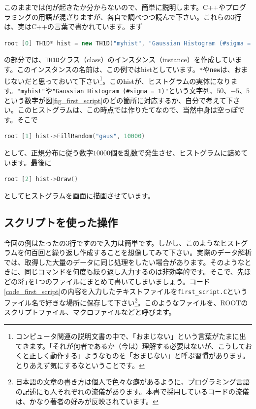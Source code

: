 このままでは何が起きたか分からないので、簡単に説明します。C++やプログラミングの用語が混ざりますが、各自で調べつつ読んで下さい。これらの3行は、実はC++の言葉で書かれています。まず
\begin{lstlisting}[language=c++]
root [0] TH1D* hist = new TH1D("myhist", "Gaussian Histogram (#sigma = 1)", 50, -5, 5)
\end{lstlisting}
の部分では、\texttt{TH1D}クラス（class）のインスタンス（instance）を作成しています。このインスタンスの名前は、この例ではhistとしています。\texttt{*}や\texttt{new}は、おまじないだと思っておいて下さい\footnote{コンピュータ関連の説明文書の中で、「おまじない」という言葉がたまに出てきます。「それが何者であるか（今は）理解する必要はないが、こうしておくと正しく動作する」ようなものを「おまじない」と呼ぶ習慣があります。とりあえず気にするなということです。}。このhistが、ヒストグラムの実体になります。\texttt{"myhist"}や\texttt{"Gaussian Histogram (\#sigma = 1)"}という文字列、$50$、$-5$、$5$という数字が図\ref{fig_first_script}のどの箇所に対応するか、自分で考えて下さい。このヒストグラムは、この時点では作りたてなので、当然中身は空っぽです。そこで
\begin{lstlisting}[language=c++]
root [1] hist->FillRandom("gaus", 10000)
\end{lstlisting}
として、正規分布に従う数字$10000$個を乱数で発生させ、ヒストグラムに詰めています。最後に
\begin{lstlisting}[language=c++]
root [2] hist->Draw()
\end{lstlisting}
としてヒストグラムを画面に描画させています。

\subsection{スクリプトを使った操作}
今回の例はたったの3行ですので入力は簡単です。しかし、このようなヒストグラムを何百回と繰り返し作成することを想像してみて下さい。実際のデータ解析では、取得した大量のデータに同じ処理をしたい場合があります。そのようなときに、同じコマンドを何度も繰り返し入力するのは非効率的です。そこで、先ほどの3行を1つのファイルにまとめて書いてしまいましょう。コード\ref{code_first_script}の内容を入力したテキストファイルを\texttt{first\_script.C}というファイル名で好きな場所に保存して下さい\footnote{日本語の文章の書き方は個人で色々な癖があるように、プログラミング言語の記述にも人それぞれの流儀があります。本書で採用しているコードの流儀は、かなり著者の好みが反映されています。}。このようなファイルを、ROOTのスクリプトファイル、マクロファイルなどと呼びます。


